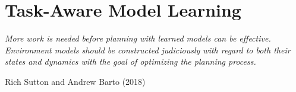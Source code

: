 
\chapter{Task-Aware Model Learning}
\label{CHA:TAML}

\epigraph{\textit{More work is needed before planning with learned
    models can be effective. Environment models should be
    constructed judiciously with regard to both their states and
    dynamics with the goal of optimizing the planning process.}}{Rich
  Sutton and Andrew Barto (2018)}


